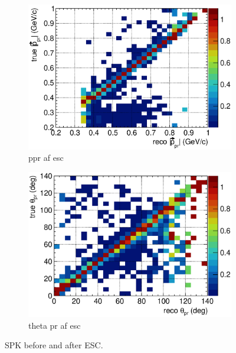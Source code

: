 \begin{figure}
        \begin{subfigure}[b]{\dbfigwid\textwidth}
             \centering
             \includegraphics[width=\textwidth]{figures/sel/p_pr_colnor_resmat_al14.eps}
             \caption{ppr af esc}
             \label{subfig:esc-ppr-bfesc}
        \end{subfigure}
        \begin{subfigure}[b]{\dbfigwid\textwidth}
             \centering
             \includegraphics[width=\textwidth]{figures/sel/theta_pr_colnor_resmat_al14.eps}
             \caption{theta pr af esc}
             \label{subfig:esc-tpr-bfesc}
        \end{subfigure}
        \caption{SPK before and after ESC.}
        \label{fig:esc-spk}
  \end{figure}


